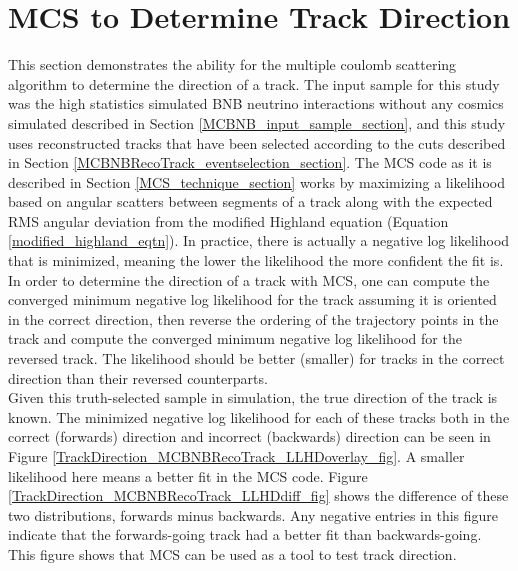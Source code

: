 \section{MCS to Determine Track Direction}\label{TrackDirection_MCBNBRecoTrack_section}
This section demonstrates the ability for the multiple coulomb scattering algorithm to determine the direction of a track. The input sample for this study was the high statistics simulated BNB neutrino interactions without any cosmics simulated described in Section \ref{MCBNB_input_sample_section}, and this study uses reconstructed tracks that have been selected according to the cuts described in Section \ref{MCBNBRecoTrack_eventselection_section}. The MCS code as it is described in Section \ref{MCS_technique_section} works by maximizing a likelihood based on angular scatters between segments of a track along with the expected RMS angular deviation from the modified Highland equation (Equation \ref{modified_highland_eqtn}). In practice, there is actually a negative log likelihood that is minimized, meaning the lower the likelihood the more confident the fit is. In order to determine the direction of a track with MCS, one can compute the converged minimum negative log likelihood for the track assuming it is oriented in the correct direction, then reverse the ordering of the trajectory points in the track and compute the converged minimum negative log likelihood for the reversed track. The likelihood should be better (smaller) for tracks in the correct direction than their reversed counterparts.\\

Given this truth-selected sample in simulation, the true direction of the track is known. The minimized negative log likelihood for each of these tracks both in the correct (forwards) direction and incorrect (backwards) direction can be seen in Figure \ref{TrackDirection_MCBNBRecoTrack_LLHDoverlay_fig}. A smaller likelihood here means a better fit in the MCS code. Figure \ref{TrackDirection_MCBNBRecoTrack_LLHDdiff_fig} shows the difference of these two distributions, forwards minus backwards. Any negative entries in this figure indicate that the forwards-going track had a better fit than backwards-going. This figure shows that MCS can be used as a tool to test track direction.

